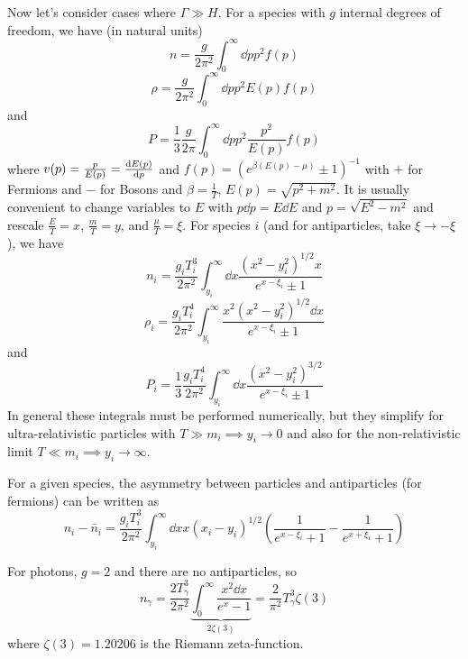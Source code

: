 \documentclass[a4paper,twoside,master.tex]{subfiles}
\begin{document}
Now let's consider cases where $ \Gamma \gg H $. For a species with $ g $ internal degrees of freedom, we have (in natural units)
\begin{equation}
    n = \frac{g}{2 \pi^2} \int_0^{\infty} \dd{p} p^2 f(p)
\end{equation}
\begin{equation}
    \rho = \frac{g}{2 \pi^2} \int_0^{\infty} \dd{p} p^2 E(p) f(p)
\end{equation}
and
\begin{equation}
    P = \frac{1}{3} \frac{g}{2 \pi} \int_0^{\infty} \dd{p} p^2 \frac{p^2}{E(p)} f(p)
\end{equation}
where $ v(p) = \frac{p}{E(p)} = \dv{E(p)}{p} $ and $ f(p) = (e^{\beta (E(p) - \mu)} \pm 1)^{-1} $ with $ + $ for Fermions and $ - $ for Bosons and $ \beta = \frac{1}{T} $, $ E(p) = \sqrt{p^2 + m^2} $. It is usually convenient to change variables to $ E $ with $ p \dd{p} = E \dd{E} $ and $ p = \sqrt{E^2 - m^2} $ and rescale $ \frac{E}{T} = x $, $ \frac{m}{T} = y $, and $ \frac{\mu}{T} = \xi $. For species $ i $ (and for antiparticles, take $ \xi \to - \xi $), we have
\begin{equation}
    n_i = \frac{g_i T_i^3}{2 \pi^2} \int_{y_i}^{\infty} \dd{x} \frac{(x^2 - y_i^2)^{1/2} x}{e^{x- \xi_i} \pm 1}
\end{equation}
\begin{equation}
    \rho_i = \frac{g_i T_i^4}{2 \pi^2} \int_{y_i}^{\infty} \frac{x^2 (x^2 - y_i^2)^{1/2} \dd{x}}{e^{x - \xi_i} \pm 1}
\end{equation}
and
\begin{equation}
    P_i = \frac{1}{3} \frac{g_i T_i^4}{2 \pi^2} \int_{y_i}^{\infty} \dd{x} \frac{(x^2 - y_i^2)^{3/2}}{e^{x - \xi_i} \pm 1}
\end{equation}
In general these integrals must be performed numerically, but they simplify for ultra-relativistic particles with $ T \gg m_i \implies y_i \to 0 $ and also for the non-relativistic limit $ T \ll m_i \implies y_i \to \infty $.

For a given species, the asymmetry between particles and antiparticles (for fermions) can be written as
\begin{equation}
    n_i - \bar{n}_i = \frac{g_i T_i^3}{2 \pi^2} \int_{y_i}^{\infty} \dd{x} x (x_i - y_i)^{1/2} \left( \frac{1}{e^{x - \xi_i} + 1} - \frac{1}{e^{x + \xi_i} + 1} \right)
\end{equation}

For photons, $ g = 2 $ and there are no antiparticles, so
\begin{equation}
    n_{\gamma} = \frac{2 T_{\gamma}^3}{2 \pi^2} \underbrace{\int_0^{\infty} \frac{x^2 \dd{x}}{e^x - 1}}_{2 \zeta(3)} = \frac{2}{\pi^2} T_{\gamma}^3 \zeta(3)
\end{equation}
where $ \zeta(3) = 1.20206 $ is the Riemann zeta-function.
\end{document}
